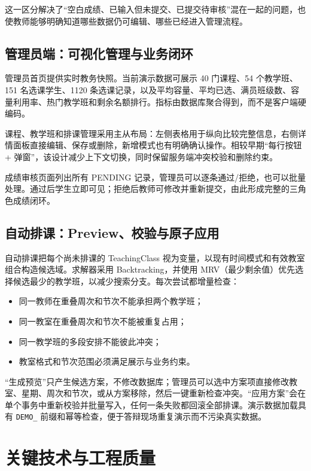 \documentclass[UTF8,11pt,a4paper]{ctexart}
\newcommand{\codeword}[1]{\texttt{\color{VCGreen}#1}}
\begin{document}
这一区分解决了“空白成绩、已输入但未提交、已提交待审核”混在一起的问题，也使教师能够明确知道哪些数据仍可编辑、哪些已经进入管理流程。

\subsection{管理员端：可视化管理与业务闭环}

管理员首页提供实时教务快照。当前演示数据可展示 40 门课程、54 个教学班、151 名选课学生、1120 条选课记录，以及平均容量、平均已选、满员班级数、容量利用率、热门教学班和剩余名额排行。指标由数据库聚合得到，而不是客户端硬编码。

课程、教学班和排课管理采用主从布局：左侧表格用于纵向比较完整信息，右侧详情面板直接编辑、保存或删除，新增模式也有明确确认操作。相较早期“每行按钮 + 弹窗”，该设计减少上下文切换，同时保留服务端冲突校验和删除约束。

成绩审核页面列出所有 PENDING 记录，管理员可以逐条通过/拒绝，也可以批量处理。通过后学生立即可见；拒绝后教师可修改并重新提交，由此形成完整的三角色成绩闭环。

\subsection{自动排课：Preview、校验与原子应用}

自动排课把每个尚未排课的 TeachingClass 视为变量，以现有时间模式和有效教室组合构造候选域。求解器采用 Backtracking，并使用 MRV（最少剩余值）优先选择候选最少的教学班，以减少搜索分支。每次尝试都增量检查：

\begin{itemize}
  \item 同一教师在重叠周次和节次不能承担两个教学班；
  \item 同一教室在重叠周次和节次不能被重复占用；
  \item 同一教学班的多段安排不能彼此冲突；
  \item 教室格式和节次范围必须满足展示与业务约束。
\end{itemize}

“生成预览”只产生候选方案，不修改数据库；管理员可以选中方案项直接修改教室、星期、周次和节次，或从方案移除，然后一键重新检查冲突。“应用方案”会在单个事务中重新校验并批量写入，任何一条失败都回滚全部排课。演示数据加载具有 \codeword{DEMO\_} 前缀和幂等检查，便于答辩现场重复演示而不污染真实数据。

\section{关键技术与工程质量}
\end{document}
